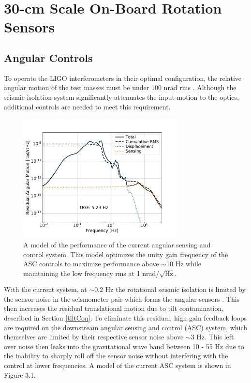 \documentclass [12pt, proquest]{uwthesis}[2019]
\begin{document}
\chapter{30-cm Scale On-Board Rotation Sensors}\label{cBRS_chap}
\section{Angular Controls}\label{ASC}
To operate the LIGO interferometers in their optimal configuration, the relative angular motion of the test masses must be under 100 nrad rms \cite{ASC}. Although the seismic isolation system significantly attenuates the input motion to the optics, additional controls are needed to meet this requirement. 

\begin{figure}[!h]
\begin{center}
\includegraphics[width=0.75\textwidth]{cBRS_ASC_Without.pdf}
\caption[Model of the performance of the current angular sensing and control system]{A model of the performance of the current angular sensing and control system. This model optimizes the unity gain frequency of the ASC controls to maximize performance above $\sim$10 Hz while maintaining the low frequency rms at 1 nrad/$\sqrt{\text{Hz}}$.}
\label{ascWithout}
\end{center}
\end{figure}

With the current system, at $\sim$0.2 Hz the rotational seismic isolation is limited by the sensor noise in the seismometer pair which forms the angular sensors \cite{windproofing}. This then increases the residual translational motion due to tilt contamination, described in Section \ref{tiltCon}. To eliminate this residual, high gain feedback loops are required on the downstream angular sensing and control (ASC) system, which themselves are limited by their respective sensor noise above $\sim$3 Hz. This left over noise then leaks into the gravitational wave band between 10 - 55 Hz due to the inability to sharply roll off the sensor noise without interfering with the control at lower frequencies. A model of the current ASC system is shown in Figure 3.1.
\end{document}
